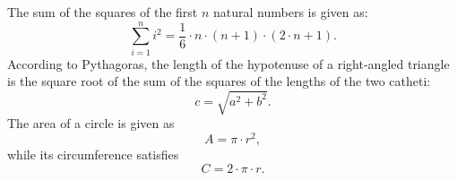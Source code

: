 \documentclass{article}
\begin{document}
The sum of the squares of the first $n$ natural numbers is given as:
$$ \sum\limits_{i=1}^{n} i^{2} = \frac{1}{6} \cdot n \cdot (n+1) \cdot (2\cdot n + 1). $$
According to Pythagoras, the length of the hypotenuse of a right-angled triangle is
the square root of the sum of the squares of the lengths of the two catheti:
$$ c = \sqrt{a^{2} + b^{2}}.  $$
The area of a circle is given as 
$$  A = \pi \cdot r^{2},   $$ 
while its circumference satisfies
$$ C = 2 \cdot \pi \cdot r.  $$
\end{document}

